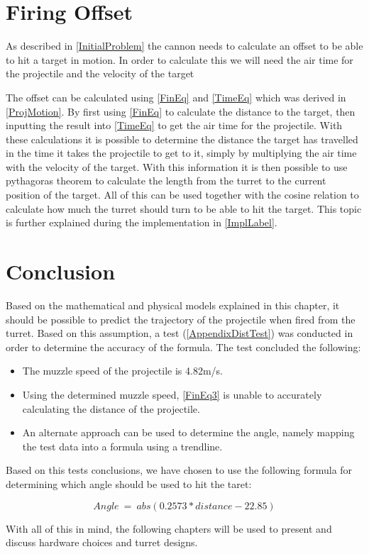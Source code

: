 \section{Firing Offset}
As described in \autoref{InitialProblem} the cannon needs to calculate an
offset to be able to hit a target in motion. In order to calculate this we will
need the air time for the projectile and the velocity of the target\nl

The offset can be calculated using \autoref{FinEq} and \autoref{TimeEq} which
was derived in \autoref{ProjMotion}. By first using \autoref{FinEq} to
calculate the distance to the target, then inputting the result into
\autoref{TimeEq} to get the air time for the projectile. With these calculations
it is possible to determine the distance the target has travelled in the time it
takes the projectile to get to it, simply by multiplying the air time with the
velocity of the target. With this information it is then possible to use
pythagoras theorem to calculate the length from the turret to the current
position of the target. All of this can be used together with the cosine
relation to calculate how much the turret should turn to be able to hit the
target. This topic is further explained during the implementation in
\autoref{ImplLabel}.

\section{Conclusion}
Based on the mathematical and physical models explained in this chapter, it
should be possible to predict the trajectory of the projectile when fired from
the turret. Based on this assumption, a test (\autoref{AppendixDistTest}) was
conducted in order to determine the accuracy of the formula. The test concluded
the following:
\begin{itemize}
  \item The muzzle speed of the projectile is 4.82m/s.
  \item Using the determined muzzle speed, \autoref{FinEq3} is unable to
  accurately calculating the distance of the projectile.
  \item An alternate approach can be used to determine the angle, namely mapping
  the test data into a formula using a trendline.  
\end{itemize}

Based on this tests conclusions, we have chosen to use the following formula for
determining which angle should be used to hit the taret:

\begin{equation}\label{angleCalc}
Angle\ =\ abs(0.2573 * distance - 22.85)
\end{equation}


With all of this in mind, the following chapters will be used to present
and discuss hardware choices and turret designs.
